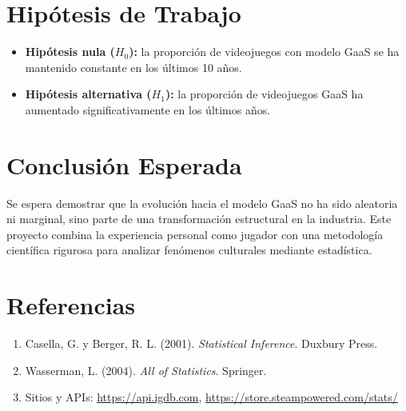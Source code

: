 \documentclass[12pt]{article}
\begin{document}
\section{Hipótesis de Trabajo}
\begin{itemize}
    \item \textbf{Hipótesis nula ($H_0$):} la proporción de videojuegos con modelo GaaS se ha mantenido constante en los últimos 10 años.
    \item \textbf{Hipótesis alternativa ($H_1$):} la proporción de videojuegos GaaS ha aumentado significativamente en los últimos años.
\end{itemize}

\section{Conclusión Esperada}
Se espera demostrar que la evolución hacia el modelo GaaS no ha sido aleatoria ni marginal, sino parte de una transformación estructural en la industria. Este proyecto combina la experiencia personal como jugador con una metodología científica rigurosa para analizar fenómenos culturales mediante estadística.

\section*{Referencias}
\begin{enumerate}
    \item Casella, G. y Berger, R. L. (2001). \emph{Statistical Inference}. Duxbury Press.
    \item Wasserman, L. (2004). \emph{All of Statistics}. Springer.
    \item Sitios y APIs: \url{https://api.igdb.com}, \url{https://store.steampowered.com/stats/}
\end{enumerate}
\end{document}
